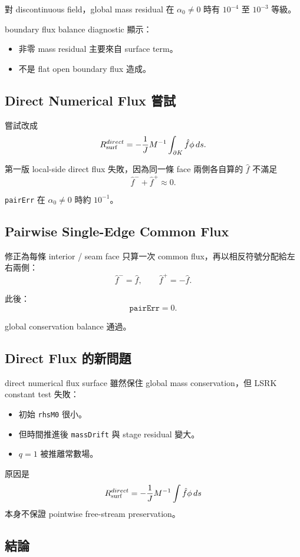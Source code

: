 \documentclass[UTF8,12pt,a4paper]{ctexart}
\begin{document}
對 discontinuous field，global mass residual 在 $\alpha_0\neq0$ 時有 $10^{-4}$ 至 $10^{-3}$ 等級。

boundary flux balance diagnostic 顯示：
\begin{itemize}
  \item 非零 mass residual 主要來自 surface term。
  \item 不是 flat open boundary flux 造成。
\end{itemize}

\subsection{Direct Numerical Flux 嘗試}

嘗試改成
\[
R_{\rm surf}^{direct}
=
-\frac{1}{J}
M^{-1}
\int_{\partial K}
\hat f\phi\,ds.
\]

第一版 local-side direct flux 失敗，因為同一條 face 兩側各自算的 $\hat f$ 不滿足
\[
\hat f^-+\hat f^+\approx0.
\]

\texttt{pairErr} 在 $\alpha_0\neq0$ 時約 $10^{-1}$。

\subsection{Pairwise Single-Edge Common Flux}

修正為每條 interior / seam face 只算一次 common flux，再以相反符號分配給左右兩側：
\[
\hat f^-=\hat f,\qquad
\hat f^+=-\hat f.
\]

此後：
\[
\texttt{pairErr}=0.
\]

global conservation balance 通過。

\subsection{Direct Flux 的新問題}

direct numerical flux surface 雖然保住 global mass conservation，但 LSRK constant test 失敗：
\begin{itemize}
  \item 初始 \texttt{rhsM0} 很小。
  \item 但時間推進後 \texttt{massDrift} 與 stage residual 變大。
  \item $q=1$ 被推離常數場。
\end{itemize}

原因是
\[
R_{\rm surf}^{direct}
=
-\frac{1}{J}M^{-1}\int\hat f\phi\,ds
\]
本身不保證 pointwise free-stream preservation。

\subsection{結論}
\end{document}
